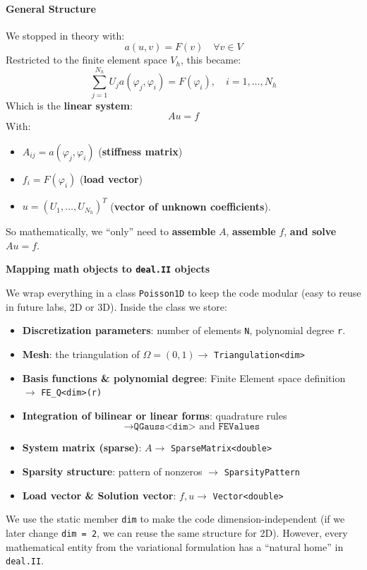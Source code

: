 \paragraph{General Structure}

We stopped in theory with:
\begin{equation*}
    a(u,v) = F(v) \quad \forall v \in V
\end{equation*}
Restricted to the finite element space $V_h$, this became:
\begin{equation*}
    \sum_{j=1}^{N_h} U_j a(\varphi_j,\varphi_i) = F(\varphi_i), \quad i=1,\dots,N_h
\end{equation*}
Which is the \textbf{linear system}:
\begin{equation*}
    A u = f
\end{equation*}
With:
\begin{itemize}
    \item $A_{ij} = a(\varphi_j,\varphi_i)$ (\textbf{stiffness matrix})
    \item $f_i = F(\varphi_i)$ (\textbf{load vector})
    \item $u = (U_1, \ldots, U_{N_h})^T$ (\textbf{vector of unknown coefficients}).
\end{itemize}
So mathematically, we ``only'' need to \textbf{assemble} $A$, \textbf{assemble} $f$, \textbf{and solve} $Au=f$.

\highspace
\begin{flushleft}
    \textcolor{Green3}{ \textbf{Mapping math objects to \texttt{deal.II} objects}}
\end{flushleft}
We wrap everything in a class \texttt{Poisson1D} to keep the code modular (easy to reuse in future labs, 2D or 3D). Inside the class we store:
\begin{itemize}
    \item \textbf{Discretization parameters}: number of elements \texttt{N}, polynomial degree \texttt{r}.
    \item \textbf{Mesh}: the triangulation of $\Omega=(0,1) \rightarrow$ \texttt{Triangulation<dim>}
    \item \textbf{Basis functions \& polynomial degree}: Finite Element space definition $\rightarrow$ \texttt{FE\_Q<dim>(r)}
    \item \textbf{Integration of bilinear or linear forms}: quadrature rules
    \begin{equation*}
        \rightarrow \texttt{QGauss<dim>} \text{ and } \texttt{FEValues}
    \end{equation*}
    \item \textbf{System matrix (sparse)}: $A \rightarrow$ \texttt{SparseMatrix<double>}
    \item \textbf{Sparsity structure}: pattern of nonzeros $\rightarrow$ \texttt{SparsityPattern}
    \item \textbf{Load vector \& Solution vector}: $f, u \rightarrow$ \texttt{Vector<double>}
\end{itemize}
We use the static member \texttt{dim} to make the code dimension-independent (if we later change \texttt{dim = 2}, we can reuse the same structure for 2D). However, every mathematical entity from the variational formulation has a ``natural home'' in \texttt{deal.II}.

